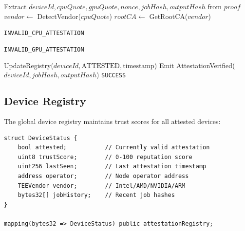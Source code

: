 \begin{algorithm}[H]
\caption{A-Chain Attestation Verification}
\begin{algorithmic}[1]
    \State Extract $deviceId, cpuQuote, gpuQuote, nonce, jobHash, outputHash$ from $proof$
    \State $vendor \gets$ DetectVendor($cpuQuote$)
    \State $rootCA \gets$ GetRootCA($vendor$)
    
        \State \Return \texttt{INVALID\_CPU\_ATTESTATION}
    \EndIf
    
            \State \Return \texttt{INVALID\_GPU\_ATTESTATION}
        \EndIf
    \EndIf
    
    \State UpdateRegistry($deviceId, \text{ATTESTED}, \text{timestamp}$)
    \State Emit AttestationVerified($deviceId, jobHash, outputHash$)
    \State \Return \texttt{SUCCESS}
\EndFunction
\end{algorithmic}
\end{algorithm}

\subsection{Device Registry}

The global device registry maintains trust scores for all attested devices:

\begin{lstlisting}[language=Solidity, basicstyle=\small\ttfamily]
struct DeviceStatus {
    bool attested;           // Currently valid attestation
    uint8 trustScore;        // 0-100 reputation score
    uint256 lastSeen;        // Last attestation timestamp
    address operator;        // Node operator address
    TEEVendor vendor;        // Intel/AMD/NVIDIA/ARM
    bytes32[] jobHistory;    // Recent job hashes
}

mapping(bytes32 => DeviceStatus) public attestationRegistry;
\end{lstlisting}

